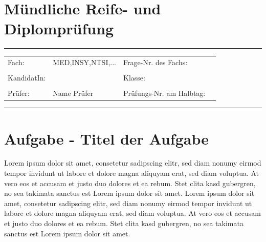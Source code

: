 \documentclass[
a4paper,     %
12pt         %
]{scrartcl}  %
\newcommand{\SUBJECT}{MED,INSY,NTSI,...}
\newcommand{\EXAMINANT}{Name Pr\"ufer}
\begin{document}
\setlength{\headsep}{20mm}


\section*{M\"undliche Reife- und Diplomprüfung}

\hrule

\begin{table}[h]
	\begin{tabular}{L{2cm}L{7cm}L{4cm}L{2cm}}
		Fach: & \SUBJECT & Frage-Nr.\tiny{ des Fachs}: &  \\ \\
		KandidatIn: &  & Klasse: &  \\ \\
		Pr\"ufer: & \EXAMINANT & Pr\"ufungs-Nr.\tiny{ am Halbtag}: &  \\
	\end{tabular}
\end{table}

\hrule

\vspace{1cm}

\section*{Aufgabe - Titel der Aufgabe}
Lorem ipsum dolor sit amet, consetetur sadipscing elitr, sed diam nonumy eirmod tempor invidunt ut labore et dolore magna aliquyam erat, sed diam voluptua. At vero eos et accusam et justo duo dolores et ea rebum. Stet clita kasd gubergren, no sea takimata sanctus est Lorem ipsum dolor sit amet. Lorem ipsum dolor sit amet, consetetur sadipscing elitr, sed diam nonumy eirmod tempor invidunt ut labore et dolore magna aliquyam erat, sed diam voluptua. At vero eos et accusam et justo duo dolores et ea rebum. Stet clita kasd gubergren, no sea takimata sanctus est Lorem ipsum dolor sit amet.


\end{document}
